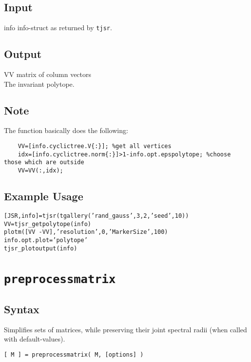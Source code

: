 \subsection*{Input}
\begin{param}
\item[info] info-struct as returned by \texttt{tjsr}.
\end{param}
\subsection*{Output}
\begin{param}
\item[VV] matrix of column vectors\\
The invariant polytope.
\end{param}
\subsection*{Note}
The function basically does the following:
\begin{verbatim}
    VV=[info.cyclictree.V{:}]; %get all vertices
    idx=[info.cyclictree.norm{:}]>1-info.opt.epspolytope; %choose those which are outside
    VV=VV(:,idx);
\end{verbatim}

\subsection*{Example Usage}
\texttt{[JSR,info]=tjsr(tgallery('rand\_gauss',3,2,'seed',10))}\\
\texttt{VV=tjsr\_getpolytope(info)}\\
\texttt{plotm([VV -VV],'resolution',0,'MarkerSize',100)}\\
\texttt{info.opt.plot='polytope'}\\
\texttt{tjsr\_plotoutput(info)}

\section{\texttt{preprocessmatrix}}\label{preprocessmatrix}
\subsection*{Syntax}
Simplifies sets of matrices, while preserving their joint spectral radii (when called with default-values).
\begin{param}
\item \texttt{[ M ] = preprocessmatrix( M, [options] ) }
\end{param}


